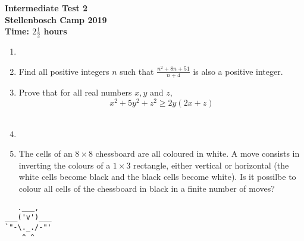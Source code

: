 \documentclass{article}
\begin{document}
\thispagestyle{empty}

\begin{center}
  \textbf{\Large Intermediate Test 2}
  \\ \vspace{1em}
  \textbf{\large Stellenbosch Camp 2019}
  \\ \vspace{1em}
  \textbf{\large Time: $2\frac{1}{2}$ hours}
\end{center}

\vspace{6.81mm}

\begin{enumerate}[1.]

\item %
\\
\vspace{6.81mm}

\item %
Find all positive integers $n$ such that $\frac{n^2 + 8n + 51}{n + 4}$ is also a positive integer.\\
\vspace{6.81mm}

\item %
Prove that for all real numbers $x, y$ and $z$,
$$x^2 + 5y^2 + z^2 \ge 2y(2x + z)$$\\
\vspace{6.81mm}

\item %
\\
\vspace{6.81mm}

\item %
The cells of an $8 \times 8$ chessboard are all coloured in white. A move consists in inverting the colours of a $1 \times 3$ rectangle, either vertical or horizontal (the white cells become black and the black cells become white).
Is it possilbe to colour all cells of the chessboard in black in a finite number of moves? \\

\end{enumerate}


\vfill
\begin{center}
  \begin{BVerbatim}
   .___,   
___('v')___
`"-\._./-"'
    ^ ^ 
  
  \end{BVerbatim}
\end{center}
\end{document}
